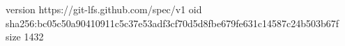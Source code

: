 version https://git-lfs.github.com/spec/v1
oid sha256:bc05c50a90410911c5c37e53adf3cf70d5d8fbe679fe631c14587c24b503b67f
size 1432
